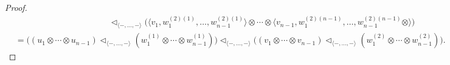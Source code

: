 \documentclass[10pt,a4paper]{amsart}
\begin{document}
\begin{proof}
\begin{align*}
  & \qquad \qquad \quad \qquad \qquad \qquad \triangleleft_{\langle -, \ldots , - \rangle }   \big(  \langle v_1, w_1^{(2) (1)}, \ldots, w_{n-1}^{(2) (1)} \rangle \otimes \cdots \otimes  \langle v_{n-1}, w_1^{ (2)(n-1)} , \ldots, w_{n-1}^{ (2)(n-1)} \otimes  \rangle  \big) \\
  &= \big(  {\scriptstyle  (u_1 \otimes \cdots \otimes u_{n-1})} \triangleleft_{\langle -, \ldots , - \rangle } {\scriptstyle  (w_1^{(1)} \otimes \cdots \otimes w_{n-1}^{(1)})}   \big) \triangleleft_{\langle -, \ldots , - \rangle } \big( {\scriptstyle  (v_1 \otimes \cdots \otimes v_{n-1})} \triangleleft_{\langle -, \ldots , - \rangle } {\scriptstyle (w_1^{(2)} \otimes \cdots \otimes w_{n-1}^{(2)})}    \big).
   \end{align*}

   \medskip


\end{proof}
\end{document}
